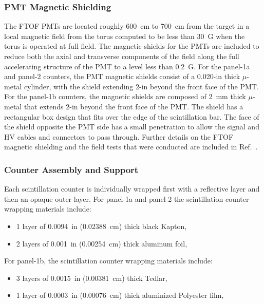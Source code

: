 \documentclass{elsart}
\begin{document}
\subsubsection{PMT Magnetic Shielding}

The FTOF PMTs are located roughly 600~cm to 700~cm from the target in a local magnetic field from
the torus computed to be less than 30~G when the torus is operated at full field. The magnetic shields
for the PMTs are included to reduce both the axial and transverse components of the field along the
full accelerating structure of the PMT to a level less than 0.2~G. For the panel-1a and panel-2 counters, the
PMT magnetic shields consist of a 0.020-in thick $\mu$-metal cylinder, with the shield extending 2-in
beyond the front face of the PMT.  For the panel-1b counters, the magnetic shields are composed of 2~mm
thick $\mu$-metal that extends 2-in beyond the front face of the PMT. The shield has a rectangular
box design that fits over the edge of the scintillation bar. The face of the shield opposite the PMT side
has a small penetration to allow the signal and HV cables and connectors to pass through. Further details
on the FTOF magnetic shielding and the field tests that were conducted are included in Ref.~\cite{ftof-shields}.

\subsubsection{Counter Assembly and Support}

Each scintillation counter is individually wrapped first with a reflective layer and then an opaque outer layer.
For panel-1a and panel-2 the scintillation counter wrapping materials include:

\begin{itemize}
\item 1 layer of 0.0094~in (0.02388~cm) thick black Kapton,
\item 2 layers of 0.001~in (0.00254~cm) thick aluminum foil,
\end{itemize}

\noindent
For panel-1b, the scintillation counter wrapping materials include:

\begin{itemize}
\item 3 layers of 0.0015~in (0.00381~cm) thick Tedlar,
\item 1 layer of 0.0003~in (0.00076~cm) thick aluminized Polyester film,
\end{itemize}
\end{document}
